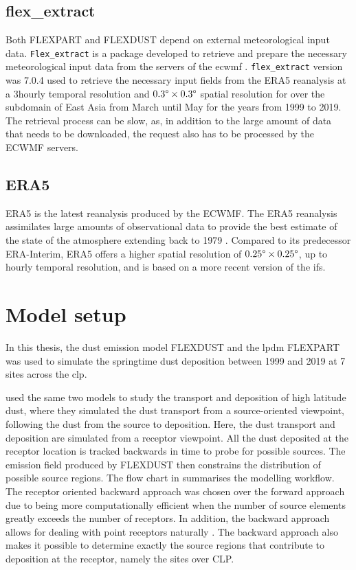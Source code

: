 \subsection{flex\_extract}
Both FLEXPART and FLEXDUST depend on external meteorological input data. \verb|Flex_extract| is a package developed to retrieve and prepare the necessary meteorological input data from the servers of the \acrfull{ecwmf} \parencite{tipka_flex_extract_2020}. 
\verb|flex_extract| version was 7.0.4 used to retrieve the necessary input fields from the ERA5 reanalysis at a 3hourly temporal resolution and $0.3\degree \times 0.3\degree$ spatial resolution for over the subdomain of East Asia from March until May for the years from 1999 to 2019. 
The retrieval process can be slow, as, in addition to the large amount of data that needs to be downloaded, the request also has to be processed by the ECWMF servers.


\subsection{ERA5}
ERA5 is the latest reanalysis produced by the ECWMF. 
The ERA5 reanalysis assimilates large amounts of observational data to provide the best estimate of the state of the atmosphere extending back to 1979 \parencite{hersbach_era5_2020}. Compared to its predecessor ERA-Interim, ERA5 offers a higher spatial resolution of $0.25\degree \times 0.25\degree$, up to hourly temporal resolution, and is based on a more recent version of the \acrfull{ifs}.


\section{Model setup}\label{sec:Model_setup}

In this thesis, the dust emission model FLEXDUST and the \acrshort{lpdm} FLEXPART was used to 
simulate the springtime dust deposition between 1999 and 2019 at 7 sites across the \acrshort{clp}. 

\textcite{flexdust_ref_2016} used the same two models to study the transport and deposition of high latitude dust, where they simulated the dust transport from a source-oriented viewpoint, following the dust from the source to deposition. 
Here, the dust transport and deposition are simulated from a receptor viewpoint. 
All the dust deposited at the receptor location is tracked backwards in time to probe for possible sources. 
The emission field produced by FLEXDUST then constrains the distribution of possible source regions. 
The flow chart in  summarises the modelling workflow. The receptor oriented backward approach was chosen over the forward approach due to being more computationally efficient when the number of source elements greatly exceeds the number of receptors. 
In addition, the backward approach allows for dealing with point receptors naturally \parencite{seibert2004source}. 
The backward approach also makes it possible to determine exactly the source regions that contribute to deposition at the receptor, namely the sites over CLP. 

